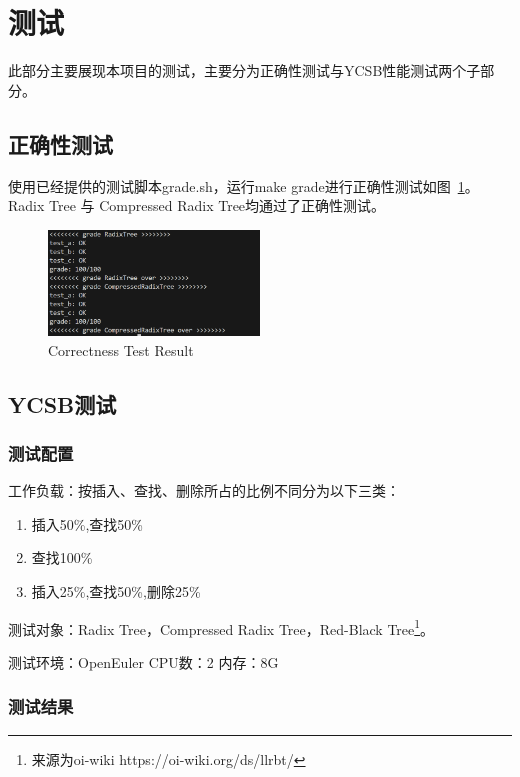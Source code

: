 \documentclass[fontset=windows]{article}
\begin{document}
\section{测试}
此部分主要展现本项目的测试，主要分为正确性测试与YCSB性能测试两个子部分。

\subsection{正确性测试}
使用已经提供的测试脚本grade.sh，运行make grade进行正确性测试如图~\ref{fig:Grade}。Radix Tree 与 Compressed Radix Tree均通过了正确性测试。

\begin{figure}[h!]
  \centering
  \includegraphics[width=0.5\textwidth]{grade}
  \caption{Correctness Test Result}
  \label{fig:Grade}

\end{figure}

\subsection{YCSB测试}

\subsubsection{测试配置}

工作负载：按插入、查找、删除所占的比例不同分为以下三类：
\begin{enumerate}
  \item 插入50\%,查找50\%
  \item 查找100\%
  \item 插入25\%,查找50\%,删除25\%
\end{enumerate}

测试对象：Radix Tree，Compressed Radix Tree，Red-Black Tree\footnote{来源为oi-wiki https://oi-wiki.org/ds/llrbt/}。

测试环境：OpenEuler CPU数：2 内存：8G 

\subsubsection{测试结果}
\end{document}
